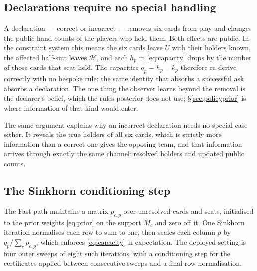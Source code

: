 \documentclass[11pt]{article}
\theoremstyle{definition}
\begin{document}
\subsection{Declarations require no special handling}
\label{app:decl}

A declaration --- correct or incorrect --- removes six cards from play and
changes the public hand counts of the players who held them. Both effects are
public. In the constraint system this means the six cards leave $U$ with their
holders known, the affected half-suit leaves $\mathcal{H}$, and each $h_p$ in
\eqref{eq:capacity} drops by the number of those cards that seat held. The
capacities $q_p = h_p - k_p$ therefore re-derive correctly with no bespoke rule:
the same identity that absorbs a successful ask absorbs a declaration. The one
thing the observer learns beyond the removal is the declarer's belief, which the
rules posterior does not use; \S\ref{sec:policyprior} is where information of
that kind would enter.

The same argument explains why an incorrect declaration needs no special case
either. It reveals the true holders of all six cards, which is strictly more
information than a correct one gives the opposing team, and that information
arrives through exactly the same channel: resolved holders and updated public
counts.

\subsection{The Sinkhorn conditioning step}
\label{app:sinkhorn}

The Fast path maintains a matrix $p_{c,p}$ over unresolved cards and seats,
initialised to the prior weights \eqref{eq:prior} on the support $M_c$ and zero
off it. One Sinkhorn iteration normalises each row to sum to one, then scales
each column $p$ by $q_p / \sum_c p_{c,p}$, which enforces \eqref{eq:capacity} in
expectation. The deployed setting is four outer sweeps of eight such iterations,
with a conditioning step for the certificates applied between consecutive sweeps
and a final row normalisation.
\end{document}
